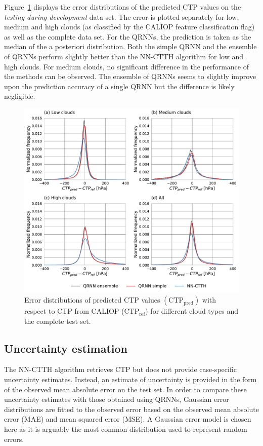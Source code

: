 \documentclass[journal abbreviation, manuscript]{copernicus}
\begin{document}
Figure~\ref{fig:ctp_results} displays the error distributions of the predicted
CTP values on the \textit{testing during development} data set. The error is
plotted separately for low, medium and high clouds (as classified by the CALIOP
feature classification flag) as well as the complete data set. For the QRNNs, the
prediction is taken as the median of the a posteriori distribution. Both the simple
QRNN and the ensemble of QRNNs perform slightly better than the NN-CTTH
algorithm for low and high clouds. For medium clouds, no significant difference
in the performance of the methods can be observed. The ensemble of QRNNs seems
to slightly improve upon the prediction accuracy of a single QRNN but the
difference is likely negligible.

\begin{figure}[hbpt!]
  \centering
  \includegraphics[width = 1.0\linewidth]{../plots/fig08}
  \caption{Error distributions of predicted CTP values $(\text{CTP}_{\text{pred}})$ with
    respect to CTP from CALIOP ($\text{CTP}_{\text{ref}}$) for different cloud types and the complete test set.}
  \label{fig:ctp_results}
\end{figure}

\subsection{Uncertainty estimation}

The NN-CTTH algorithm retrieves CTP but does not provide case-specific
uncertainty estimates. Instead, an estimate of uncertainty is provided in the
form of the observed mean absolute error on the test set. In order to compare
these uncertainty estimates with those obtained using QRNNs, Gaussian error
distributions are fitted to the observed error based on the observed mean
absolute error (MAE) and mean squared error (MSE). A Gaussian error model
is chosen here as it is arguably the most common distribution used to represent
random errors.
\end{document}
